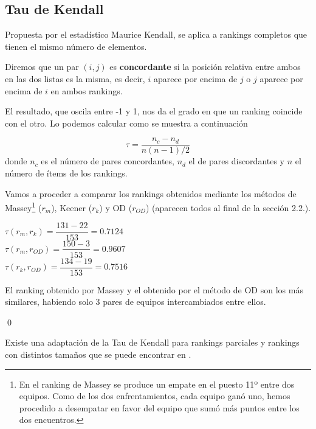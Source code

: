 \subsection{Tau de Kendall}
Propuesta por el estadístico Maurice Kendall, se aplica a rankings completos que tienen el mismo número de elementos. \\

\begin{defi} Diremos que un par $(i,j)$ es \textbf{concordante} si la posición relativa entre ambos en las dos listas es la misma, es decir, $i$ aparece por encima de $j$ o $j$ aparece por encima de $i$ en ambos rankings.
\end{defi}

El resultado, que oscila entre -1 y 1, nos da el grado en que un ranking coincide con el otro. Lo podemos calcular como se muestra a continuación

\begin{equation}
\tau = \dfrac{n_{c} - n_{d}}{n(n-1)/2}
\end{equation}
donde $n_{c}$ es el número de pares concordantes, $n_{d}$ el de pares discordantes y $n$ el número de ítems de los rankings. 

\newpage

\begin{ejem} Vamos a proceder a comparar los rankings obtenidos mediante los métodos de Massey\footnote{En el ranking de Massey se produce un empate en el puesto 11º entre dos equipos. Como de los dos enfrentamientos, cada equipo ganó uno, hemos procedido a desempatar en favor del equipo que sumó más puntos entre los dos encuentros.} ($r_{m}$), Keener ($r_{k}$) y OD ($r_{OD}$) (aparecen todos al final de la sección 2.2.).
\end{ejem}
\begin{center}
$ \tau (r_{m},r_{k}) = \dfrac{131-22}{153} = 0.7124$\\
$ \tau (r_{m},r_{OD}) = \dfrac{150-3}{153} = 0.9607$\\
$ \tau (r_{k},r_{OD}) = \dfrac{134-19}{153} = 0.7516$
\end{center}
	
El ranking obtenido por Massey y el obtenido por el método de OD son los más similares, habiendo solo 3 pares de equipos intercambiados entre ellos.

\qed

Existe una adaptación de la Tau de Kendall para rankings parciales y rankings con distintos tamaños que se puede encontrar en \cite[págs 205-206]{libro_rankings}.


